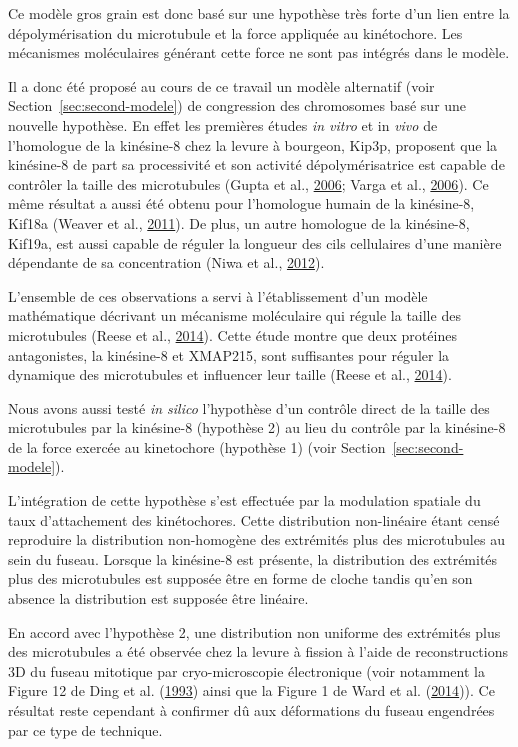 \documentclass[12pt,a4paper,twoside,openright]{book}
\begin{document}
Ce modèle gros grain est donc basé sur une hypothèse très forte d'un
lien entre la dépolymérisation du microtubule et la force appliquée au
kinétochore. Les mécanismes moléculaires générant cette force ne sont
pas intégrés dans le modèle.

Il a donc été proposé au cours de ce travail un modèle alternatif (voir
Section~\ref{sec:second-modele}) de congression des chromosomes basé sur
une nouvelle hypothèse. En effet les premières études \emph{in vitro} et
in \emph{vivo} de l'homologue de la kinésine-8 chez la levure à
bourgeon, Kip3p, proposent que la kinésine-8 de part sa processivité et
son activité dépolymérisatrice est capable de contrôler la taille des
microtubules (Gupta et al., \protect\hyperlink{ref-Gupta2006}{2006};
Varga et al., \protect\hyperlink{ref-Varga2006}{2006}). Ce même résultat
a aussi été obtenu pour l'homologue humain de la kinésine-8, Kif18a
(Weaver et al., \protect\hyperlink{ref-Weaver2011}{2011}). De plus, un
autre homologue de la kinésine-8, Kif19a, est aussi capable de réguler
la longueur des cils cellulaires d'une manière dépendante de sa
concentration (Niwa et al., \protect\hyperlink{ref-Niwa2012}{2012}).

L'ensemble de ces observations a servi à l'établissement d'un modèle
mathématique décrivant un mécanisme moléculaire qui régule la taille des
microtubules (Reese et al., \protect\hyperlink{ref-Reese2014a}{2014}).
Cette étude montre que deux protéines antagonistes, la kinésine-8 et
XMAP215, sont suffisantes pour réguler la dynamique des microtubules et
influencer leur taille (Reese et al.,
\protect\hyperlink{ref-Reese2014a}{2014}).

Nous avons aussi testé \emph{in silico} l'hypothèse d'un contrôle direct
de la taille des microtubules par la kinésine-8 (hypothèse 2) au lieu du
contrôle par la kinésine-8 de la force exercée au kinetochore (hypothèse
1) (voir Section~\ref{sec:second-modele}).

L'intégration de cette hypothèse s'est effectuée par la modulation
spatiale du taux d'attachement des kinétochores. Cette distribution
non-linéaire étant censé reproduire la distribution non-homogène des
extrémités plus des microtubules au sein du fuseau. Lorsque la
kinésine-8 est présente, la distribution des extrémités plus des
microtubules est supposée être en forme de cloche tandis qu'en son
absence la distribution est supposée être linéaire.

En accord avec l'hypothèse 2, une distribution non uniforme des
extrémités plus des microtubules a été observée chez la levure à fission
à l'aide de reconstructions 3D du fuseau mitotique par cryo-microscopie
électronique (voir notamment la Figure 12 de Ding et al.
(\protect\hyperlink{ref-Ding1993a}{1993}) ainsi que la Figure 1 de Ward
et al. (\protect\hyperlink{ref-Ward2014}{2014})). Ce résultat reste
cependant à confirmer dû aux déformations du fuseau engendrées par ce
type de technique.
\end{document}

